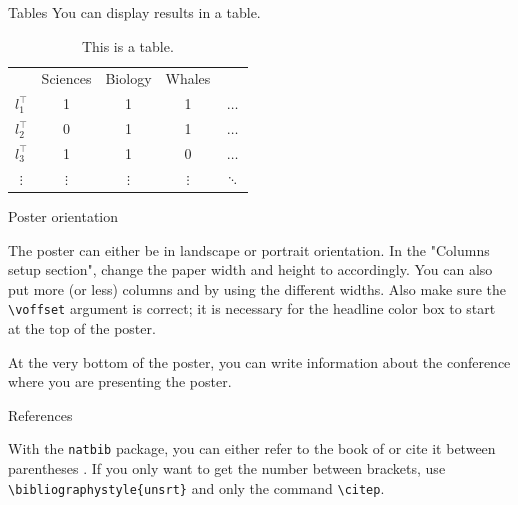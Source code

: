 \documentclass{beamer}
\newlength{\onecolwid}
\begin{document}
\begin{frame}[t, fragile]
\begin{columns}[t]
\begin{column}{\onecolwid}
\begin{block}{Tables}
	You can display results in a table.
	\vspace{1in}
	\begin{table}
		\begin{tabular}{c c c c c}
			& Sciences & Biology & Whales & \\
			$l_1^\top$ & 1 & 1 & 1 & $\dots$\\
			$l_2^\top$ & 0 & 1 & 1 & $\dots$\\
			$l_3^\top$ & 1 & 1 & 0 & $\dots$\\
			$\vdots$ & $\vdots$ & $\vdots$ & $\vdots$ & $\ddots$ \\
		\end{tabular}
		\caption{This is a table.}
	\end{table}
	
\end{block}

\begin{block}{Poster orientation}

	The poster can either be in landscape or portrait orientation. In the "Columns setup section", change the paper width and height to accordingly. You can also put more (or less) columns and by using the different widths. Also make sure the \texttt{\textbackslash voffset} argument is correct; it is necessary for the headline color box to start at the top of the poster.
	
	\vspace{0.5in}

  At the very bottom of the poster, you can write information about the conference where you are presenting the poster.
  
\end{block}


\begin{block}{References}

  With the \texttt{natbib} package, you can either refer to the book of \citet{casella2002statistical} or cite it between parentheses \citep{rosenthal2006struck}. If you only want to get the number between brackets, use \texttt{\textbackslash bibliographystyle\{unsrt\}} and only the command \texttt{\textbackslash citep}.

	\nocite{*} %
	\footnotesize{
	\vspace{0.25in}} %

\end{block}



\end{column}
\end{columns}
\end{frame}
\end{document}
